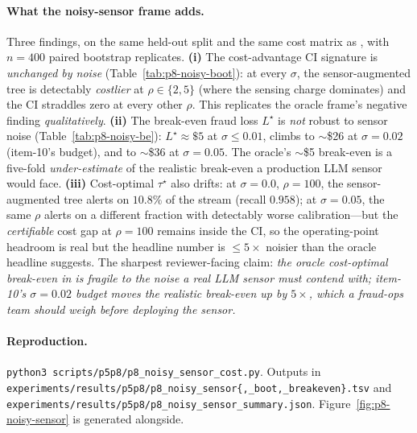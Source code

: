 \paragraph{What the noisy-sensor frame adds.} Three findings, on the
same held-out split and the same cost matrix as
, with $n{=}400$ paired bootstrap
replicates. \textbf{(i)} The cost-advantage CI signature is
\emph{unchanged by noise} (Table~\ref{tab:p8-noisy-boot}): at every
$\sigma$, the sensor-augmented tree is detectably \emph{costlier} at
$\rho \in \{2,5\}$ (where the sensing charge dominates) and the CI
straddles zero at every other $\rho$. This replicates the oracle frame's
negative finding \emph{qualitatively}. \textbf{(ii)} The break-even
fraud loss $L^\star$ is \emph{not} robust to sensor noise
(Table~\ref{tab:p8-noisy-be}): $L^\star \approx \$5$ at $\sigma \le 0.01$,
climbs to $\sim$\$26 at $\sigma{=}0.02$ (item-10's budget), and to
$\sim$\$36 at $\sigma{=}0.05$. The oracle's $\sim$\$5 break-even is a
five-fold \emph{under-estimate} of the realistic break-even a
production LLM sensor would face. \textbf{(iii)} Cost-optimal
$\tau^\star$ also drifts: at $\sigma{=}0.0$, $\rho{=}100$, the
sensor-augmented tree alerts on $10.8\%$ of the stream (recall
$0.958$); at $\sigma{=}0.05$, the same $\rho$ alerts on a different
fraction with detectably worse calibration---but the
\emph{certifiable} cost gap at $\rho{=}100$ remains inside the CI, so
the operating-point headroom is real but the headline number is
$\le 5\times$ noisier than the oracle headline suggests. The sharpest
reviewer-facing claim: \emph{the oracle cost-optimal break-even in
 is fragile to the noise a real
LLM sensor must contend with; item-10's $\sigma{=}0.02$ budget moves
the realistic break-even up by $5\times$, which a fraud-ops team
should weigh before deploying the sensor.}

\paragraph{Reproduction.}
\texttt{python3 scripts/p5p8/p8\_noisy\_sensor\_cost.py}. Outputs in
\texttt{experiments/results/p5p8/p8\_noisy\_sensor\{,\_boot,\_breakeven\}.tsv}
and \texttt{experiments/results/p5p8/p8\_noisy\_sensor\_summary.json}.
Figure~\ref{fig:p8-noisy-sensor} is generated alongside.